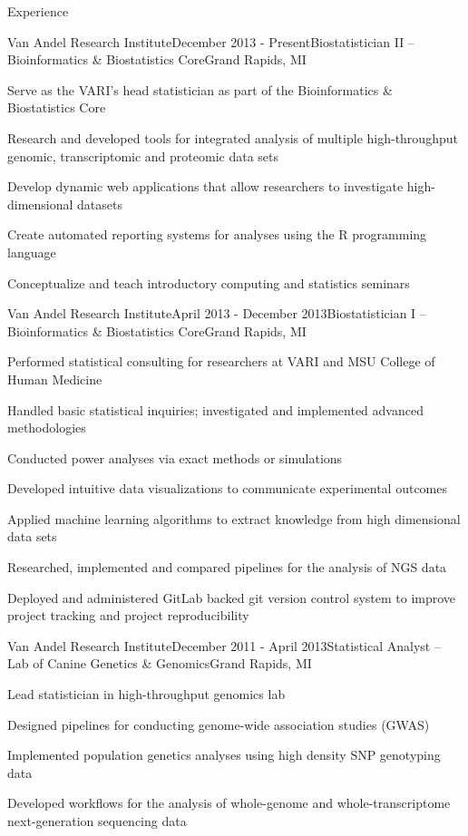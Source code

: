 \documentclass{resume} %
\begin{document}
\begin{rSection}{Experience}

\begin{rSubsection}{Van Andel Research Institute}{December 2013 - Present}{Biostatistician II -- Bioinformatics \& Biostatistics Core}{Grand Rapids, MI}
\item Serve as the VARI's head statistician as part of the Bioinformatics \& Biostatistics Core 
\item Research and developed tools for integrated analysis of multiple high-throughput genomic, transcriptomic and proteomic data sets
\item Develop dynamic web applications that allow researchers to investigate high-dimensional datasets
\item Create automated reporting systems for analyses using the R programming language
\item Conceptualize and teach introductory computing and statistics seminars
\end{rSubsection}



\begin{rSubsection}{Van Andel Research Institute}{April 2013 - December 2013}{Biostatistician I -- Bioinformatics \& Biostatistics Core}{Grand Rapids, MI}
\item Performed statistical consulting for researchers at VARI and MSU College of Human Medicine
\item Handled basic statistical inquiries; investigated and implemented advanced methodologies 
\item Conducted power analyses via exact methods or simulations
\item Developed intuitive data visualizations to communicate experimental outcomes
\item Applied machine learning algorithms to extract knowledge from high dimensional data sets
\item Researched, implemented and compared pipelines for the analysis of NGS data
\item Deployed and administered GitLab backed git version control system to improve project tracking and project reproducibility
\end{rSubsection}


\begin{rSubsection}{Van Andel Research Institute}{December 2011 - April 2013}{Statistical Analyst -- Lab of Canine Genetics \& Genomics}{Grand Rapids, MI}
\item Lead statistician in high-throughput genomics lab
\item Designed pipelines for conducting genome-wide association studies (GWAS) 
\item Implemented population genetics analyses using high density SNP genotyping data
\item Developed workflows for the analysis of whole-genome and whole-transcriptome next-generation sequencing data
\end{rSubsection}


\end{rSection}
\end{document}
